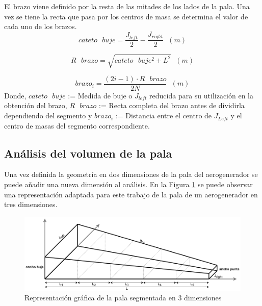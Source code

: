 El brazo viene definido por la resta de las mitades de los lados de la pala. Una vez se tiene la recta que pasa por los centros de masa se determina el valor de cada uno de los brazos.
\begin{equation}
cateto \text{ } buje = \dfrac{J_{left}}{2} - \dfrac{J_{right}}{2} \hspace{7pt} (m)
\end{equation}

\begin{equation}
R \text{ } brazo = \sqrt{cateto \text{ } buje^{2} + L^{2}} \hspace{7pt} (m)
\end{equation}

\begin{equation}
brazo_i = \dfrac{(2i -1) \cdot R \text{ } brazo}{2N} \hspace{7pt} (m)
\end{equation}
Donde, $cateto \text{ } buje$ := Medida de buje o $J_{left}$ reducida para su utilización en la obtención del brazo, $R \text{ } brazo$ := Recta completa del brazo antes de dividirla dependiendo del segmento y $brazo_i$ := Distancia entre el centro de $J_{Left}$ y el centro de masas del segmento correspondiente.

\subsection{Análisis del volumen de la pala}
\label{section:volumen_pala}

Una vez definida la geometría en dos dimensiones de la pala del aerogenerador se puede añadir una nueva dimensión al análisis. En la Figura \ref{fig:analisis_volumen} se puede observar una representación adaptada para este trabajo de la pala de un aerogenerador en tres dimensiones.

    \begin{figure}[H]
    \centering
    \includegraphics[width=1\textwidth]{images/pala 3d segmentada enorme.png}
    \caption{Representación gráfica de la pala segmentada en 3 dimensiones}
    \label{fig:analisis_volumen}
    
\end{figure}



